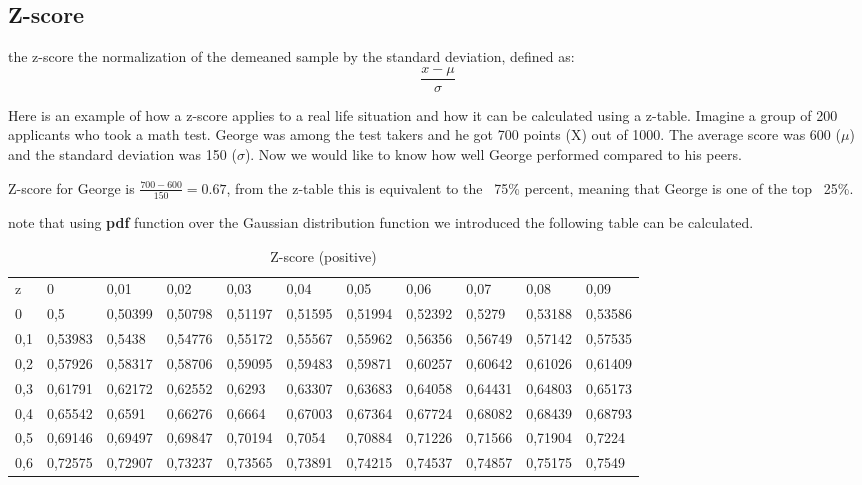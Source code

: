 \documentclass[4apaper,12pt]{book}
\begin{document}
\begin{description}
    \subsection{Z-score}
  \item the z-score the normalization of the demeaned sample by the standard deviation, defined as:
    \begin{equation} \frac{x-\mu}{\sigma} \end{equation}
  \item Here is an example of how a z-score applies to a real life situation and how it can be calculated using a z-table. Imagine a group of 200 applicants who took a math test. George was among the test takers and he got 700 points (X) out of 1000. The average score was 600 ($\mu$) and the standard deviation was 150 ($\sigma$). Now we would like to know how well George performed compared to his peers.
  \item Z-score for George is $\frac{700-600}{150} = 0.67$, from the z-table this is equivalent to the ~75\% percent, meaning that George is one of the top ~25\%.
  \item note that using \textbf{pdf} function over the Gaussian distribution function we introduced the following table can be calculated.
    \begin{table}[]
      \centering
      \caption{Z-score (positive)}
      \label{my-label}
      \begin{tabular}{lllllllllll}
        z   & 0       & 0,01    & 0,02    & 0,03    & 0,04    & 0,05    & 0,06    & 0,07    & 0,08    & 0,09    \\
        0   & 0,5     & 0,50399 & 0,50798 & 0,51197 & 0,51595 & 0,51994 & 0,52392 & 0,5279  & 0,53188 & 0,53586 \\
        0,1 & 0,53983 & 0,5438  & 0,54776 & 0,55172 & 0,55567 & 0,55962 & 0,56356 & 0,56749 & 0,57142 & 0,57535 \\
        0,2 & 0,57926 & 0,58317 & 0,58706 & 0,59095 & 0,59483 & 0,59871 & 0,60257 & 0,60642 & 0,61026 & 0,61409 \\
        0,3 & 0,61791 & 0,62172 & 0,62552 & 0,6293  & 0,63307 & 0,63683 & 0,64058 & 0,64431 & 0,64803 & 0,65173 \\
        0,4 & 0,65542 & 0,6591  & 0,66276 & 0,6664  & 0,67003 & 0,67364 & 0,67724 & 0,68082 & 0,68439 & 0,68793 \\
        0,5 & 0,69146 & 0,69497 & 0,69847 & 0,70194 & 0,7054  & 0,70884 & 0,71226 & 0,71566 & 0,71904 & 0,7224  \\
        0,6 & 0,72575 & 0,72907 & 0,73237 & 0,73565 & 0,73891 & 0,74215 & 0,74537 & 0,74857 & 0,75175 & 0,7549  \\

\end{tabular}
\end{table}
\end{description}
\end{document}
